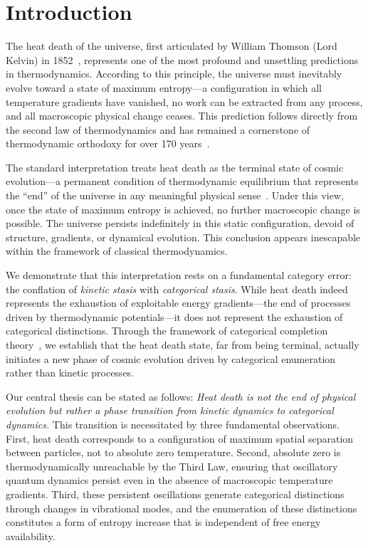 \section{Introduction}

The heat death of the universe, first articulated by William Thomson (Lord Kelvin) in 1852~\citep{thomson1852dissipation}, represents one of the most profound and unsettling predictions in thermodynamics. According to this principle, the universe must inevitably evolve toward a state of maximum entropy—a configuration in which all temperature gradients have vanished, no work can be extracted from any process, and all macroscopic physical change ceases. This prediction follows directly from the second law of thermodynamics and has remained a cornerstone of thermodynamic orthodoxy for over 170 years~\citep{clausius1865main,boltzmann1877beziehung}.

The standard interpretation treats heat death as the terminal state of cosmic evolution—a permanent condition of thermodynamic equilibrium that represents the ``end'' of the universe in any meaningful physical sense~\citep{adams1997dying,penrose2010cycles}. Under this view, once the state of maximum entropy is achieved, no further macroscopic change is possible. The universe persists indefinitely in this static configuration, devoid of structure, gradients, or dynamical evolution. This conclusion appears inescapable within the framework of classical thermodynamics.

We demonstrate that this interpretation rests on a fundamental category error: the conflation of \emph{kinetic stasis} with \emph{categorical stasis}. While heat death indeed represents the exhaustion of exploitable energy gradients—the end of processes driven by thermodynamic potentials—it does not represent the exhaustion of categorical distinctions. Through the framework of categorical completion theory~\citep{sachikonye2024categorical}, we establish that the heat death state, far from being terminal, actually initiates a new phase of cosmic evolution driven by categorical enumeration rather than kinetic processes.

Our central thesis can be stated as follows: \emph{Heat death is not the end of physical evolution but rather a phase transition from kinetic dynamics to categorical dynamics.} This transition is necessitated by three fundamental observations. First, heat death corresponds to a configuration of maximum spatial separation between particles, not to absolute zero temperature. Second, absolute zero is thermodynamically unreachable by the Third Law, ensuring that oscillatory quantum dynamics persist even in the absence of macroscopic temperature gradients. Third, these persistent oscillations generate categorical distinctions through changes in vibrational modes, and the enumeration of these distinctions constitutes a form of entropy increase that is independent of free energy availability.


